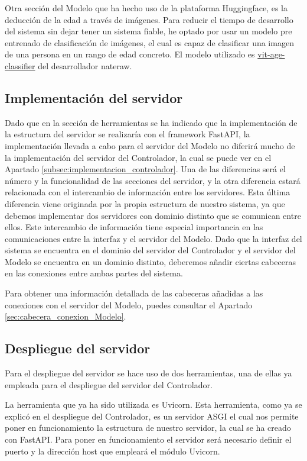 Otra sección del Modelo que ha hecho uso de la plataforma Huggingface, es la deducción de la edad a través de imágenes. Para reducir el tiempo de desarrollo del sistema sin dejar tener un sistema fiable, he optado por usar un modelo pre entrenado de clasificación de imágenes, el cual es capaz de clasificar una imagen de una persona en un rango de edad concreto. El modelo utilizado es \href{https://huggingface.co/nateraw/vit-age-classifier}{vit-age-classifier} del desarrollador nateraw.

\subsection{Implementación del servidor}

Dado que en la sección de herramientas se ha indicado que la implementación de la estructura del servidor se realizaría con el \gls{framework} FastAPI, la implementación llevada a cabo para el servidor del Modelo no diferirá mucho de la implementación del servidor del Controlador, la cual se puede ver en el Apartado \ref{subsec:implementacion_controlador}. Una de las diferencias será el número y la funcionalidad de las secciones del servidor, y la otra diferencia estará relacionada con el intercambio de información entre los servidores. Esta última diferencia viene originada por la propia estructura de nuestro sistema, ya que debemos implementar dos servidores con dominio distinto que se comunican entre ellos. Este intercambio de información tiene especial importancia en las comunicaciones entre la interfaz y el servidor del Modelo. Dado que la interfaz del sistema se encuentra en el dominio del servidor del Controlador y el servidor del Modelo se encuentra en un dominio distinto, deberemos añadir ciertas cabeceras en las conexiones entre ambas partes del sistema.

Para obtener una información detallada de las cabeceras añadidas a las conexiones con el servidor del Modelo, puedes consultar el Apartado \ref{sec:cabecera_conexion_Modelo}.

\subsection{Despliegue del servidor}

Para el despliegue del servidor se hace uso de dos herramientas, una de ellas ya empleada para el despliegue del servidor del Controlador.

La herramienta que ya ha sido utilizada es Uvicorn. Esta herramienta, como ya se explicó en el despliegue del Controlador, es un servidor ASGI el cual nos permite poner en funcionamiento la estructura de nuestro servidor, la cual se ha creado con FastAPI. Para poner en funcionamiento el servidor será necesario definir el puerto y la dirección host que empleará el módulo Uvicorn.

